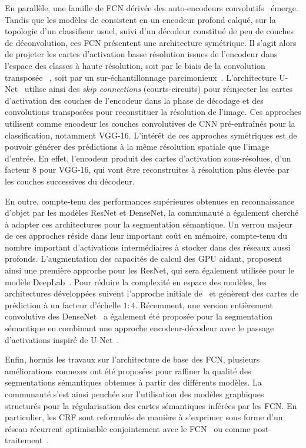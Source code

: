En parallèle, une famille de \gls{FCN} dérivée des auto-encodeurs convolutifs~\cite{zhao_stacked_2015} émerge. Tandis que les modèles de \citet{long_fully_2015} consistent en un encodeur profond calqué, sur la topologie d'un classifieur usuel, suivi d'un décodeur constitué de peu de couches de déconvolution, ces \gls{FCN} présentent une architecture symétrique. Il s'agit alors de projeter les cartes d'activation basse résolution issues de l'encodeur dans l'espace des classes à haute résolution, soit par le biais de la convolution transposée ~\cite{nekrasov_global_2016,noh_learning_2015}, soit par un sur-échantillonnage parcimonieux~\cite{badrinarayanan_segnet_2017}. L'architecture U-Net~\cite{ronneberger_u-net_2015} utilise ainsi des \emph{skip connections} (courts-circuits) pour réinjecter les cartes d'activation des couches de l'encodeur dans la phase de décodage et des convolutions transposées pour reconstituer la résolution de l'image. Ces approches utilisent comme encodeur les couches convolutives de \gls{CNN} pré-entraînés pour la classification, notamment VGG-16. L'intérêt de ces approches symétriques est de pouvoir générer des prédictions à la même résolution spatiale que l'image d'entrée. En effet, l'encodeur produit des cartes d'activation sous-résolues, d'un facteur 8 pour VGG-16, qui vont être reconstruites à résolution plus élevée par les couches successives du décodeur.

En outre, compte-tenu des performances supérieures obtenues en reconnaissance d'objet par les modèles ResNet et DenseNet, la communauté a également cherché à adapter ces architectures pour la segmentation sémantique. Un verrou majeur de ces approches réside dans leur important coût en mémoire, compte-tenu du nombre important d'activations intermédiaires à stocker dans des réseaux aussi profonds. L'augmentation des capacités de calcul des \gls{GPU} aidant, \citet{wu_high-performance_2016} proposent ainsi une première approche pour les ResNet, qui sera également utilisée pour le modèle DeepLab~\cite{chen_deeplab_2018}. Pour réduire la complexité en espace des modèles, les architectures développées suivent l'approche initiale de~\citet{long_fully_2015} et génèrent des cartes de prédiction à un facteur d'échelle $1:4$. Récemment, une version entièrement convolutive des DenseNet~\cite{jegou_one_2017} a également été proposée pour la segmentation sémantique en combinant une approche encodeur-décodeur avec le passage d'activations inspiré de U-Net~\cite{ronneberger_u-net_2015}.

Enfin, hormis les travaux sur l'architecture de base des \gls{FCN}, plusieurs améliorations connexes ont été proposées pour raffiner la qualité des segmentations sémantiques obtenues à partir des différents modèles. La communauté s'est ainsi penchée sur l'utilisation des modèles graphiques structurés pour la régularisation des cartes sémantiques inférées par les \gls{FCN}. En particulier, les \gls{CRF} sont reformulés de manière à s'exprimer sous forme d'un réseau récurrent optimisable conjointement avec le \gls{FCN}~\cite{zheng_conditional_2015} ou comme post-traitement~\cite{arnab_higher_2015}.

